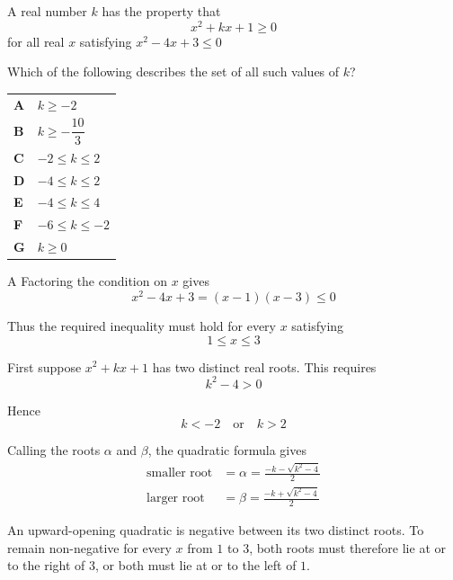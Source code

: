 \documentclass[11pt,a4paper]{article}
\begin{document}
\clearpage
\thispagestyle{djssolutions}
\vspace*{8pt}
\begin{enumerate}[label=\textbf{\arabic*.},leftmargin=*,itemsep=0pt,start=10]
\questionitem[Inequalities]
A real number $k$ has the property that \[ x^2+kx+1\ge 0 \] for all real $x$ satisfying $x^2-4x+3\le 0$

Which of the following describes the set of all such values of $k$?

\par\vspace*{12pt}
\begin{tabularx}{\linewidth}{@{}>{\bfseries}l Y@{}}
A &
$k\ge -2$
\\[0.8em]
B &
$k\ge -\dfrac{10}{3}$
\\[0.8em]
C &
$-2\le k\le 2$
\\[0.8em]
D &
$-4\le k\le 2$
\\[0.8em]
E &
$-4\le k\le 4$
\\[0.8em]
F &
$-6\le k\le -2$
\\[0.8em]
G &
$k\ge 0$
\\
\end{tabularx}

\begin{djsSolution}{A}
Factoring the condition on $x$ gives
\[
x^2-4x+3=(x-1)(x-3)\le0
\]

Thus the required inequality must hold for every $x$ satisfying
\[
1\le x\le3
\]

First suppose $x^2+kx+1$ has two distinct real roots. This requires
\[
k^2-4>0
\]

Hence
\[
k<-2\quad\text{or}\quad k>2
\]

Calling the roots $\alpha$ and $\beta$, the quadratic formula gives
\[
\begin{aligned}
\text{smaller root}&=\alpha=\frac{-k-\sqrt{k^2-4}}2\\[8pt]
\text{larger root}&=\beta=\frac{-k+\sqrt{k^2-4}}2
\end{aligned}
\]

An upward-opening quadratic is negative between its two distinct roots. To remain non-negative for every $x$ from $1$ to $3$, both roots must therefore lie at or to the right of $3$, or both must lie at or to the left of $1$.


\end{djsSolution}
\end{enumerate}
\end{document}
